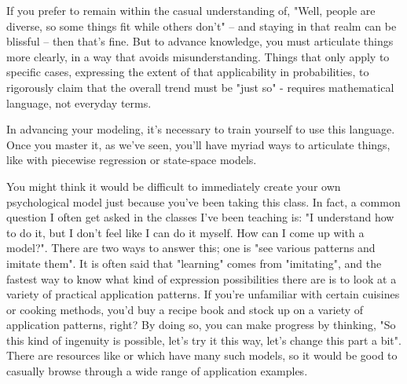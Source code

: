 \documentclass{ltjsbook}
\begin{document}
If you prefer to remain within the casual understanding of, "Well, people are diverse, so some things fit while others don't" -- and staying in that realm can be blissful -- then that's fine. But to advance knowledge, you must articulate things more clearly, in a way that avoids misunderstanding. Things that only apply to specific cases, expressing the extent of that applicability in probabilities, to rigorously claim that the overall trend must be "just so" - requires mathematical language, not everyday terms.

In advancing your modeling, it's necessary to train yourself to use this language. Once you master it, as we've seen, you'll have myriad ways to articulate things, like with piecewise regression or state-space models.


You might think it would be difficult to immediately create your own psychological model just because you've been taking this class. In fact, a common question I often get asked in the classes I've been teaching is: "I understand how to do it, but I don't feel like I can do it myself. How can I come up with a model?". There are two ways to answer this; one is "see various patterns and imitate them". It is often said that "learning" comes from "imitating", and the fastest way to know what kind of expression possibilities there are is to look at a variety of practical application patterns. If you're unfamiliar with certain cuisines or cooking methods, you'd buy a recipe book and stock up on a variety of application patterns, right? By doing so, you can make progress by thinking, "So this kind of ingenuity is possible, let's try it this way, let's change this part a bit". There are resources like \textcite{Lee201709} or \textcite{Toyoda2017,Tanobei2018,Tanobei2019} which have many such models, so it would be good to casually browse through a wide range of application examples.
\end{document}

